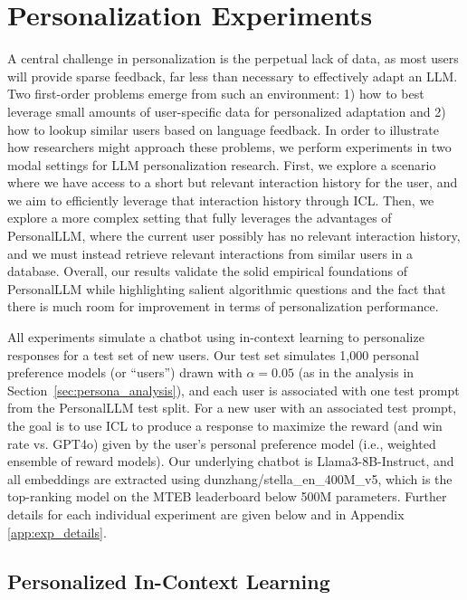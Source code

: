 \section{Personalization Experiments}\label{sec:experiments}

A central challenge in personalization is the perpetual lack of data, as most users will provide sparse feedback, far
less
than necessary to effectively adapt an LLM.
Two first-order problems emerge from such an environment: 1) how to best leverage small amounts of user-specific data for personalized adaptation and 2) how to lookup similar users based on language feedback.
In order to illustrate how researchers might approach these problems, we perform experiments in two modal settings for LLM personalization research.
First, we explore a scenario where we have access to a short but relevant interaction history for the user, and we aim to efficiently leverage that interaction history through ICL.  
Then, we explore a more complex setting that fully leverages the advantages of \textsf{PersonalLLM}, where the current user possibly has no relevant interaction history, and we must instead retrieve relevant interactions from similar users in a database.
Overall, our results validate the solid empirical foundations of \textsf{PersonalLLM} while highlighting salient algorithmic questions and the fact that there is much room for improvement in terms of personalization performance.

All experiments simulate a chatbot using in-context learning to personalize responses for a test set of new users.
Our test set simulates 1,000 personal preference models (or ``users'') drawn with $\alpha=0.05$ (as in the analysis in Section~\ref{sec:persona_analysis}), and each user is associated with one test prompt from the \textsf{PersonalLLM} test split.
For a new user with an associated test prompt, the goal is to use ICL to produce a response to maximize the reward (and win rate vs. GPT4o) given by the user's personal preference model (i.e., weighted ensemble of reward models).
Our underlying chatbot is Llama3-8B-Instruct, and all embeddings are extracted using dunzhang/stella\_en\_400M\_v5, which is the top-ranking model on the MTEB \citep{muennighoff2023mtebmassivetextembedding} leaderboard below 500M parameters.
Further details for each individual experiment are given below and in Appendix \ref{app:exp_details}.

\subsection{Personalized In-Context Learning}

